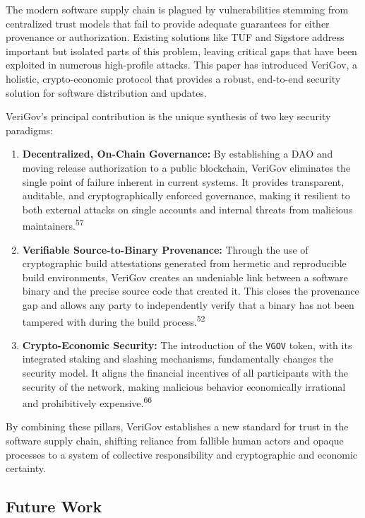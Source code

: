 \documentclass{article}
\begin{document}
The modern software supply chain is plagued by vulnerabilities stemming from centralized trust models that fail to provide adequate guarantees for either provenance or authorization. Existing solutions like TUF and Sigstore address important but isolated parts of this problem, leaving critical gaps that have been exploited in numerous high-profile attacks. This paper has introduced VeriGov, a holistic, crypto-economic protocol that provides a robust, end-to-end security solution for software distribution and updates.

VeriGov's principal contribution is the unique synthesis of two key security paradigms:

\begin{enumerate}
\item \textbf{Decentralized, On-Chain Governance:} By establishing a DAO and moving release authorization to a public blockchain, VeriGov eliminates the single point of failure inherent in current systems. It provides transparent, auditable, and cryptographically enforced governance, making it resilient to both external attacks on single accounts and internal threats from malicious maintainers.\textsuperscript{57}
\item \textbf{Verifiable Source-to-Binary Provenance:} Through the use of cryptographic build attestations generated from hermetic and reproducible build environments, VeriGov creates an undeniable link between a software binary and the precise source code that created it. This closes the provenance gap and allows any party to independently verify that a binary has not been tampered with during the build process.\textsuperscript{52}
\item \textbf{Crypto-Economic Security:} The introduction of the \lstinline{VGOV} token, with its integrated staking and slashing mechanisms, fundamentally changes the security model. It aligns the financial incentives of all participants with the security of the network, making malicious behavior economically irrational and prohibitively expensive.\textsuperscript{66}
\end{enumerate}

By combining these pillars, VeriGov establishes a new standard for trust in the software supply chain, shifting reliance from fallible human actors and opaque processes to a system of collective responsibility and cryptographic and economic certainty.

\subsection{Future Work}
\end{document}

